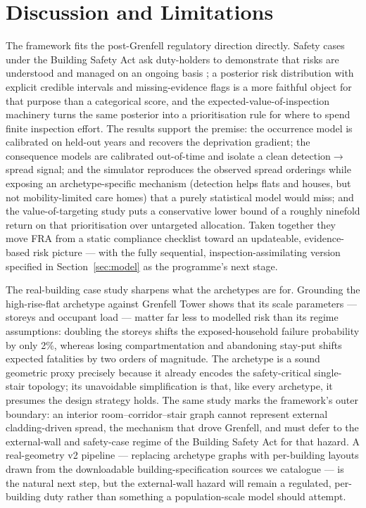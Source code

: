 \section{Discussion and Limitations}
\label{sec:discussion}

The framework fits the post-Grenfell regulatory direction directly. Safety cases
under the Building Safety Act ask duty-holders to demonstrate that risks are
understood and managed on an ongoing basis \citep{grenfell2024phase2,bsa2022};
a posterior risk distribution with explicit credible intervals and
missing-evidence flags is a more faithful object for that purpose than a
categorical score, and the expected-value-of-inspection machinery turns the same
posterior into a prioritisation rule for where to spend finite inspection effort.
The results support the premise: the occurrence model is calibrated on held-out
years and recovers the deprivation gradient; the consequence models are calibrated
out-of-time and isolate a clean detection$\to$spread signal; and the simulator
reproduces the observed spread orderings while exposing an archetype-specific
mechanism (detection helps flats and houses, but not mobility-limited care homes)
that a purely statistical model would miss; and the value-of-targeting study puts a
conservative lower bound of a roughly ninefold return on that prioritisation over
untargeted allocation. Taken together they move FRA from a static compliance
checklist \citep{pas79_1_2020,pas79_2_2020} toward an updateable, evidence-based
risk picture --- with the fully sequential, inspection-assimilating version
specified in Section~\ref{sec:model} as the programme's next stage.

The real-building case study sharpens what the archetypes are for. Grounding the
high-rise-flat archetype against Grenfell Tower shows that its scale parameters ---
storeys and occupant load --- matter far less to modelled risk than its regime
assumptions: doubling the storeys shifts the exposed-household failure probability by
only 2\%, whereas losing compartmentation and abandoning stay-put shifts expected
fatalities by two orders of magnitude. The archetype is a sound geometric proxy
precisely because it already encodes the safety-critical single-stair topology; its
unavoidable simplification is that, like every archetype, it presumes the design
strategy holds. The same study marks the framework's outer boundary: an interior
room--corridor--stair graph cannot represent external cladding-driven spread, the
mechanism that drove Grenfell, and must defer to the external-wall and safety-case
regime of the Building Safety Act for that hazard. A real-geometry v2 pipeline ---
replacing archetype graphs with per-building layouts drawn from the downloadable
building-specification sources we catalogue
--- is the natural next step, but the external-wall hazard will remain a regulated,
per-building duty rather than something a population-scale model should attempt.

